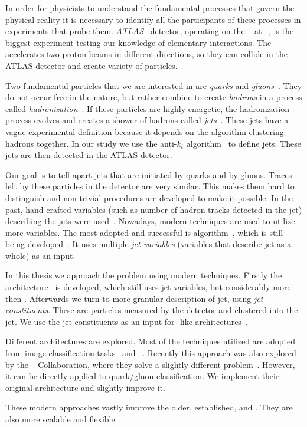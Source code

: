 

In order for physicists to understand the fundamental processes that govern the physical reality it is necessary to identify all the participants of these processes in experiments that probe them. 
\emph{ATLAS}~\cite{ATLAS} detector, operating on the \LHC~\cite{LHC} at \CERN~\cite{cern}, is the biggest experiment testing our knowledge of elementary interactions. 
The \LHC accelerates two proton beams in different directions, so they can collide in the ATLAS detector and create variety of particles.

Two fundamental particles that we are interested in are \emph{quarks} and \emph{gluons}~\cite{quarks}.
They do not occur free in the nature, but rather combine to create \emph{hadrons} in a process called \emph{hadronization}~\cite{hadronization}.
If these particles are highly energetic, the hadronization process evolves and creates a shower of hadrons called \emph{jets}~\cite{jet}.
These jets have a vague experimental definition because it depends on the algorithm clustering hadrons together.
In our study we use the anti-$k_t$ algorithm~\cite{antikt} to define jets.
These jets are then detected in the ATLAS detector.

Our goal is to tell apart jets that are initiated by quarks and by gluons. 
Traces left by these particles in the detector are very similar.
This makes them hard to distinguish and non-trivial procedures are developed to make it possible.
In the past, hand-crafted variables (such as number of hadron tracks detected in the jet) describing the jets were used~\cite{ntrk_tag}.
Nowadays, modern \ml techniques are used to utilize more variables.
The most adopted and successful is \bdt algorithm~\cite{bdt}, which is still being developed~\cite{bdt_tag}.
It uses multiple \emph{jet variables} (variables that describe jet as a whole) as an input.

In this thesis we approach the problem using modern \dl techniques.
Firstly the \highway architecture~\cite{highway} is developed, which still uses jet variables, but considerably more then \bdt. 
Afterwards we turn to more granular description of jet, using \emph{jet constituents}. 
These are particles measured by the detector and clustered into the jet. 
We use the jet constituents as an input for \trans-like architectures~\cite{att_is_all}.

Different architectures are explored.
Most of the techniques utilized are adopted from image classification tasks~\cite{deit3} and \nlp~\cite{bert}.
Recently this approach was also explored by the \CMS~\cite{cms} Collaboration, where they solve a slightly different problem~\cite{part}.
However, it can be directly applied to quark/gluon classification.
We implement their original architecture and slightly improve it.

These modern approaches vastly improve the older, established, \bdt and \highway.   
They are also more scalable and flexible.






